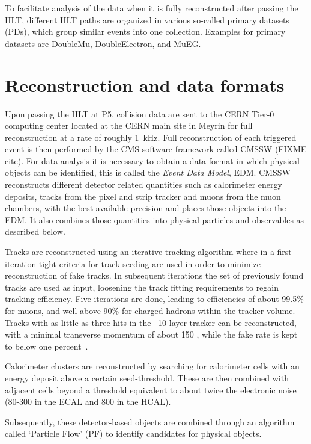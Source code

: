 To facilitate analysis of the data when it is fully reconstructed after passing the HLT, different HLT paths are organized in various so-called primary datasets (PDs), which group similar
events into one collection. Examples for primary datasets are DoubleMu, DoubleElectron, and MuEG.

\section{Reconstruction and data formats}
\label{sec:cms_reco}
Upon passing the HLT at P5, collision data are sent to the CERN Tier-0 computing center located at the CERN main site in Meyrin for full reconstruction at a rate of roughly \SI{1}{\kilo\hertz}. 
Full reconstruction of each triggered event is then performed by the CMS software framework called CMSSW (FIXME cite). For data analysis it is necessary
to obtain a data format in which physical objects can be identified, this is called the \textit{Event Data Model}, EDM. CMSSW reconstructs different detector related quantities
such as calorimeter energy deposits, tracks from the pixel and strip tracker and muons from the muon chambers, with the best available precision and places those objects into the EDM. 
It also combines those quantities into physical particles and observables as described below.

Tracks are reconstructed using an iterative tracking algorithm where in a first iteration tight criteria for track-seeding are used in order to minimize reconstruction of
fake tracks. In subsequent iterations the set of previously found tracks are used as input, loosening the track fitting requirements to regain tracking efficiency. Five iterations
are done, leading to efficiencies of about 99.5\% for muons, and well above 90\% for charged hadrons within the tracker volume. Tracks with as little as three hits in the ~10 layer
tracker can be reconstructed, with a minimal transverse momentum of about 150 \mev, while the fake rate is kept to below one percent~\cite{pfcms}.

Calorimeter clusters are reconstructed by searching for calorimeter cells with an energy deposit above a certain seed-threshold. These are then combined with adjacent cells
beyond a threshold equivalent to about twice the electronic noise (80-300 \mev in the ECAL and 800 \mev in the HCAL).

Subsequently, these detector-based objects are combined through an algorithm called `Particle Flow' (PF) to identify candidates for physical objects.

